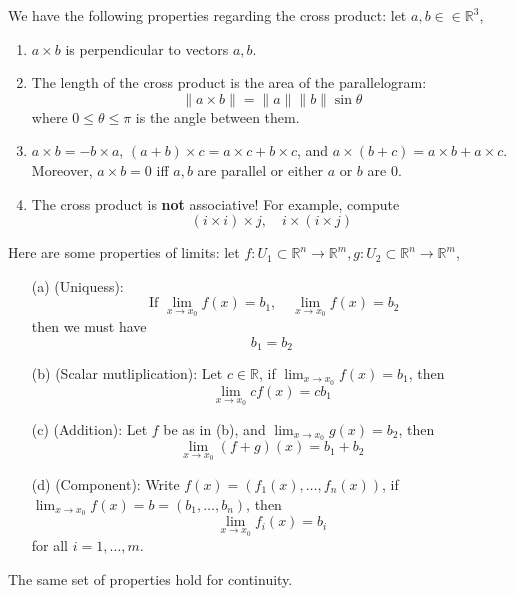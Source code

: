 \documentclass[openany]{book}
\newcommand{\R}{\mathbb{R}}
\begin{document}
\begin{prop}
    We have the following properties regarding the cross product: let $a,b\in\in\R^3$,
    \begin{enumerate}
        \item $a\times b$ is perpendicular to vectors $a,b$.
        \item The length of the cross product is the area of the parallelogram:
        \begin{equation*}
            \|a\times b\|=\|a\|\|b\|\sin\theta
        \end{equation*}
        where $0\leq\theta\leq\pi$ is the angle between them. 
        \item $a\times b=-b\times a$, $(a+b)\times c=a\times c+b\times c$, and $a\times (b+c)=a\times b+a\times c$. Moreover, $a\times b=0$ iff $a,b$ are parallel or either $a$ or $b$ are $0$.
        \item The cross product is \textbf{not} associative! For example, compute 
        \begin{equation*}
            (i\times i)\times j, \quad i\times (i\times j)
        \end{equation*}
    \end{enumerate}
\end{prop}



\begin{prop}[limits]
    Here are some properties of limits: let $f: U_1\subset\R^n\to\R^m, g: U_2\subset\R^n\to\R^m$,
    \begin{enumerate}
        \item[(a)] (Uniquess):  \begin{equation*}
            \text{ If } \lim_{x\to x_0}f(x)=b_1, \quad \lim_{x\to x_0}f(x)=b_2
        \end{equation*}
        then we must have 
        \begin{equation*}
            b_1=b_2
        \end{equation*}
        \item[(b)] (Scalar mutliplication): Let $c\in\R$, if $\lim_{x\to x_0}f(x)=b_1$, then 
        \begin{equation*}
            \lim_{x\to x_0}cf(x)=cb_1
        \end{equation*}
        \item[(c)] (Addition): Let $f$ be as in (b), and $\lim_{x\to x_0}g(x)=b_2$, then 
        \begin{equation*}
            \lim_{x\to x_0}(f+g)(x)=b_1+b_2
        \end{equation*}
        \item[(d)] (Component): Write $f(x)=(f_1(x),\dots, f_n(x))$, if $\lim_{x\to x_0}f(x)=b=(b_1,\dots, b_n)$, then 
        \begin{equation*}
            \lim_{x\to x_0}f_i(x)=b_i
        \end{equation*}
        for all $i=1,\dots, m$.
    \end{enumerate}
    The same set of properties hold for continuity.
\end{prop}
\end{document}
